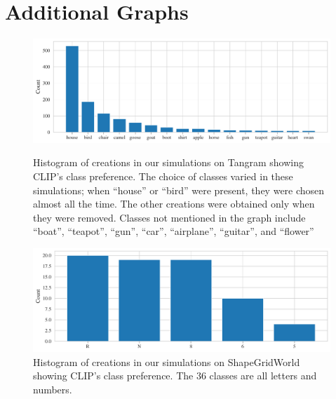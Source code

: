 \chapter{Additional Graphs}
\label{sec:additional-graphs}

\begin{figure}[h]
    \centering
    \includegraphics[width=\textwidth]{images/creations_distribution.pdf}
    \vspace{-12pt}
    \caption[Histogram of creations in our simulations on Tangram showing CLIP's class preference.]{Histogram of creations in our simulations on Tangram showing CLIP's class preference. The choice of classes varied in these simulations; when ``house'' or ``bird'' were present, they were chosen almost all the time. The other creations were obtained only when they were removed. Classes not mentioned in the graph include ``boat'', ``teapot'', ``gun'', ``car'', ``airplane'', ``guitar'', and ``flower''}
    \label{fig:class-preference-tangram}
    \vspace{12pt}
    \includegraphics[width=\textwidth]{images/creations_distribution_sgw.pdf}
    \vspace{-12pt}
    \caption[Histogram of creations in our simulations on ShapeGridWorld showing CLIP's class preference.]{Histogram of creations in our simulations on ShapeGridWorld showing CLIP's class preference. The \(36\) classes are all letters and numbers.}
    \label{fig:class-preference-sgw}
\end{figure}


